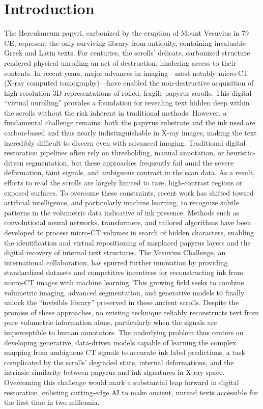 \documentclass[runningheads]{llncs}
\begin{document}
\section*{Introduction}
\label{sec:Intro}
The Herculaneum papyri, carbonized by the eruption of Mount Vesuvius in 79 CE, represent the only surviving library from antiquity, containing invaluable Greek and Latin texts. For centuries, the scrolls’ delicate, carbonized structure rendered physical unrolling an act of destruction, hindering access to their con\-tents. In recent years, major advances in imaging—most notably micro-CT (X-ray computed tomography)—have enabled the non-destructive acquisition of high-resolution 3D representations of rolled, fragile papyrus scrolls. This digital “virtual unrolling” provides a foundation for revealing text hidden deep within the scrolls without the risk inherent in traditional methods. However, a fun\-damental challenge remains: both the papyrus substrate and the ink used are carbon-based and thus nearly indistinguishable in X-ray images, making the text incredibly difficult to discern even with advanced imaging. Traditional digital restoration pipelines often rely on thresholding, manual annotation, or heuristic-driven segmentation, but these approaches frequently fail amid the severe deformation, faint signals, and ambiguous contrast in the scan data. As a result, efforts to read the scrolls are largely limited to rare, high-contrast regions or exposed surfaces. To overcome these constraints, recent work has shifted toward artificial intelligence, and particu\-larly machine learning, to recognize subtle patterns in the volumetric data indicative of ink presence. Methods such as convolutional neural networks, transformers, and tailored algorithms have been developed to process micro-CT volumes in search of hidden characters, enabling the identification and virtual repositioning of misplaced papyrus layers and the digital recovery of internal text structures. The Vesuvius Challenge, an international collaboration, has spurred further innovation by providing standar\-dized datasets and competitive incentives for reconstructing ink from micro-CT images with machine learning. This growing field seeks to combine volumetric imaging, advanced segmentation, and generative models to finally unlock the “invisible library” preserved in these ancient scrolls. Despite the promise of these approaches, no existing technique reliably reconstructs text from pure volumetric information alone, particularly when the signals are imperceptible to human annotators. The underlying problem thus centers on developing generative, data-driven models capable of learning the complex mapping from ambiguous CT signals to accurate ink label predictions, a task complicated by the scrolls’ degraded state, internal deformations, and the intrinsic similarity between papyrus and ink signatures in X-ray space. Overcoming this challenge would mark a substantial leap forward in digital restoration, enlisting cutting-edge AI to make ancient, unread texts accessible for the first time in two millennia.
\end{document}
